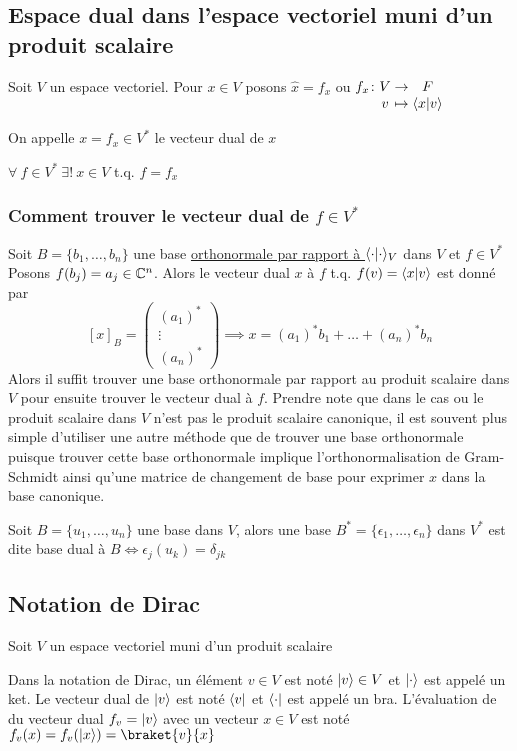 \subsection{Espace dual dans l'espace vectoriel muni d'un produit scalaire}
Soit $V$ un espace vectoriel. Pour $x \in V$ posons $\hat{x} = f_x$ ou $\myfunc{f_x}{V}{F}{v}{\scpr{x}{v}}$
\begin{definition}
    On appelle $x = f_x \in V^*$ le vecteur dual de $x$
\end{definition}
\begin{theorem}
    $\forall \ f \in V^* \ \exists! \ x \in V$ t.q. $f = f_x$
\end{theorem}
\subsubsection{Comment trouver le vecteur dual de \texorpdfstring{$f \in V^*$}{f in V star}}
Soit $B = \{b_1, \dots, b_n\}$ une base \underline{orthonormale par rapport à $\langle \cdot \lvert \cdot \rangle_V$} dans $V$ et $f \in V^*$ \\
Posons $f(b_j) = a_j \in \mathbb{C}^n$. Alors le vecteur dual $x$ à $f$ t.q. $f(v) = \langle x \lvert v \rangle$ est donné par  
\[
[x]_B = \begin{pmatrix} (a_1)^* \\ \vdots \\ (a_n)^* \end{pmatrix} \implies 
x = (a_1)^* b_1 + \dots + (a_n)^* b_n
\]
Alors il suffit trouver une base orthonormale par rapport au produit scalaire dans $V$ pour 
ensuite trouver le vecteur dual à $f$. Prendre note que dans le cas ou le produit scalaire
dans $V$ n'est pas le produit scalaire canonique, il est souvent plus simple d'utiliser une 
autre méthode que de trouver une base orthonormale puisque trouver cette base orthonormale
implique l'orthonormalisation de Gram-Schmidt ainsi qu'une matrice de changement de base pour
exprimer $x$ dans la base canonique.
\begin{definition}
    Soit $B = \{u_1, \dots, u_n\}$ une base dans $V$, alors 
    une base $B^* = \{\epsilon_1, \dots, \epsilon_n\}$ dans $V^*$ est dite base dual à 
    $B \iff \epsilon_j(u_k) = \delta_{jk}$ 
\end{definition}
\subsection{Notation de Dirac}
Soit $V$ un espace vectoriel muni d'un produit scalaire
\begin{definition}
    Dans la notation de Dirac, un élément $v \in V$ est noté $\lvert v\rangle \in V$ et $\lvert\cdot\rangle$ est appelé un ket. 
    Le vecteur dual de $\lvert v\rangle$ est noté $\langle v\rvert$ et $\langle\cdot\rvert$ est appelé un bra. L'évaluation de 
    du vecteur dual $f_v = \lvert v\rangle$ avec un vecteur $x \in V$ est noté $f_v(x) = f_v(\ket{x}) = \braket{v}{x}$
\end{definition}